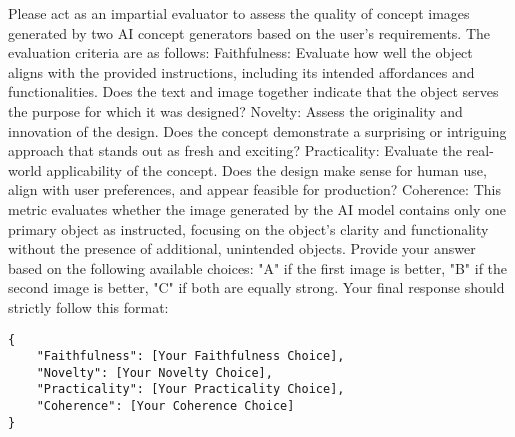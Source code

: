 \begin{tcolorbox}[colback=gray!10, colframe=black, title=Prompt for Relative Automatic Evaluation]

Please act as an impartial evaluator to assess the quality of concept images generated by two AI concept generators based on the user’s requirements. The evaluation criteria are as follows:
Faithfulness: Evaluate how well the object aligns with the provided instructions, including its intended affordances and functionalities. Does the text and image together indicate that the object serves the purpose for which it was designed? 
Novelty: Assess the originality and innovation of the design. Does the concept demonstrate a surprising or intriguing approach that stands out as fresh and exciting?
Practicality: Evaluate the real-world applicability of the concept. Does the design make sense for human use, align with user preferences, and appear feasible for production?
Coherence: This metric evaluates whether the image generated by the AI model contains only one primary object as instructed, focusing on the object's clarity and functionality without the presence of additional, unintended objects.
Provide your answer based on the following available choices:
"A" if the first image is better,
"B" if the second image is better,
"C" if both are equally strong.
Your final response should strictly follow this format: 
\begin{verbatim}
{
    "Faithfulness": [Your Faithfulness Choice],
    "Novelty": [Your Novelty Choice],
    "Practicality": [Your Practicality Choice],
    "Coherence": [Your Coherence Choice]
}

\end{verbatim}
\label{app:relative-prompt}
\end{tcolorbox}


% 


